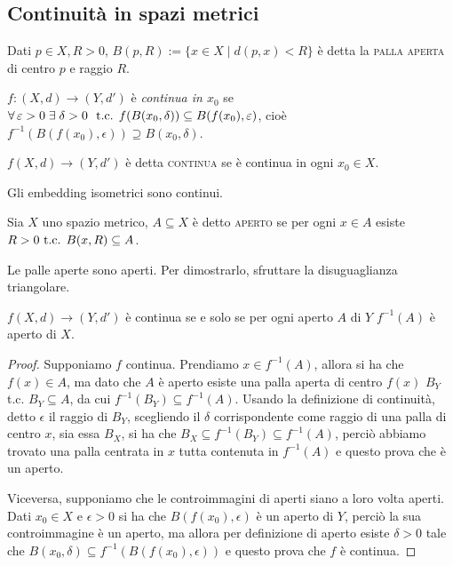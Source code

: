 \documentclass{article}
\begin{document}
\subsection{Continuità in spazi metrici}
\begin{defn}
Dati $p \in X, R>0$, ${B(p, R):=\{ x \in X \mid d(p, x)<R\}}$ è detta la
\textsc{palla aperta} di centro $p$ e raggio $R$.
\end{defn}

\begin{defn}
${f:(X, d) \rightarrow (Y, d')}$ è \textit{continua in $x_0$} se
${\forall \epsilon > 0 \; \exists \; \delta >0}\\\ \tc {f(B(x_0, \delta))
\subseteq B(f(x_0), \epsilon)}$, cioè ${f^{-1}(B(f(x_0), \epsilon)) \supseteq
B(x_0, \delta)}$.
\end{defn}

\begin{defn}
${f(X, d) \rightarrow (Y, d')}$ è detta \textsc{continua} se è continua in ogni
${x_0 \in X}$.
\end{defn}

\begin{oss}
Gli embedding isometrici sono continui.
\end{oss}

\begin{defn}
Sia $X$ uno spazio metrico, $A \subseteq X$ è detto \textsc{aperto} se per ogni
$x \in A$ esiste ${R>0 \text{ t.c. } B(x, R) \subseteq A}$.
\end{defn}

\begin{ftt}
Le palle aperte sono aperti. Per dimostrarlo, sfruttare la disuguaglianza
triangolare.
\end{ftt}

\begin{thm} \label{thm:cont_inv}
$f(X, d) \rightarrow (Y, d')$ è continua se e solo se per ogni aperto $A$ di $Y$
$f^{-1}(A)$ è aperto di $X$.
\end{thm}

\begin{proof}
Supponiamo $f$ continua. Prendiamo $x \in f^{-1}(A)$, allora si ha che $f(x) \in
A$, ma dato che $A$ è aperto esiste una palla aperta di centro $f(x)$ $B_Y$ t.c.
$B_Y \subseteq A$, da cui $f^{-1}(B_Y) \subseteq f^{-1}(A)$. Usando la
definizione di continuità, detto $\epsilon$ il raggio di $B_Y$, scegliendo il
$\delta$ corrispondente come raggio di una palla di centro $x$, sia essa $B_X$,
si ha che $B_X \subseteq f^{-1}(B_Y) \subseteq f^{-1}(A)$, perciò abbiamo
trovato una palla centrata in $x$ tutta contenuta in $f^{-1}(A)$ e questo prova
che è un aperto.

Viceversa, supponiamo che le controimmagini di aperti siano a loro volta aperti.
Dati $x_0 \in X$ e $\epsilon >0$ si ha che $B(f(x_0), \epsilon)$ è un aperto di
$Y$, perciò la sua controimmagine è un aperto, ma allora per definizione di
aperto esiste $\delta>0$ tale che $B(x_0, \delta) \subseteq f^{-1}(B(f(x_0),
\epsilon))$ e questo prova che $f$ è continua.
\end{proof}
\end{document}
